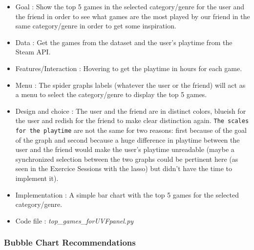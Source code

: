 \documentclass{article}
\begin{document}
	\begin{itemize}
		\item Goal : Show the top 5 games in the selected category/genre for the user and the friend in order to see what games are the most played by our friend in the same category/genre in order to get some inspiration.
		\item Data : Get the games from the dataset and the user's playtime from the Steam API.
		\item Features/Interaction : Hovering to get the playtime in hours for each game.
		\item Menu : The spider graphs labels (whatever the user or the friend) will act as a menu to select the category/genre to display the top 5 games.
		\item Design and choice : The user and the friend are in distinct colors, blueish for the user and redish for the friend to make clear distinction again. \texttt{The scales for the playtime} are not the same for two reasons: first because of the goal of the graph and second because a huge difference in playtime between the user and the friend would make the user's playtime unreadable (maybe a synchronized selection between the two graphs could be pertinent here (as seen in the Exercice Sessions with the lasso) but didn't have the time to implement it).
		\item Implementation : A simple bar chart with the top 5 games for the selected category/genre.
		\item Code file : \textit{top\_games\_forUVFpanel.py}
	\end{itemize}
	
	\subsubsection{Bubble Chart Recommendations}
	
\end{document}
